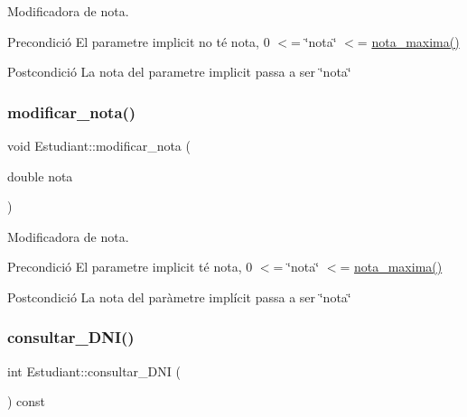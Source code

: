 Modificadora de nota. 

\begin{DoxyPrecond}{Precondició}
El parametre implicit no té nota, 0 $<$= \char`\"{}nota\char`\"{} $<$= \hyperlink{class_estudiant_a5df5eed414c87a2a1c2efa4194633afd}{nota\+\_\+maxima()} 
\end{DoxyPrecond}
\begin{DoxyPostcond}{Postcondició}
La nota del parametre implicit passa a ser \char`\"{}nota\char`\"{} 
\end{DoxyPostcond}
\mbox{\label{class_estudiant_a5d5eded678c16a864f22477d401a56af}} 
\subsubsection{\texorpdfstring{modificar\+\_\+nota()}{modificar\_nota()}}
{\footnotesize\ttfamily void Estudiant\+::modificar\+\_\+nota (\begin{DoxyParamCaption}\item[{double}]{nota }\end{DoxyParamCaption})}



Modificadora de nota. 

\begin{DoxyPrecond}{Precondició}
El parametre implicit té nota, 0 $<$= \char`\"{}nota\char`\"{} $<$= \hyperlink{class_estudiant_a5df5eed414c87a2a1c2efa4194633afd}{nota\+\_\+maxima()} 
\end{DoxyPrecond}
\begin{DoxyPostcond}{Postcondició}
La nota del paràmetre implícit passa a ser \char`\"{}nota\char`\"{} 
\end{DoxyPostcond}
\mbox{\label{class_estudiant_ad37108e53c6c0f1fcb5786e77e1902f5}} 
\subsubsection{\texorpdfstring{consultar\+\_\+\+D\+N\+I()}{consultar\_DNI()}}
{\footnotesize\ttfamily int Estudiant\+::consultar\+\_\+\+D\+NI (\begin{DoxyParamCaption}{ }\end{DoxyParamCaption}) const}



